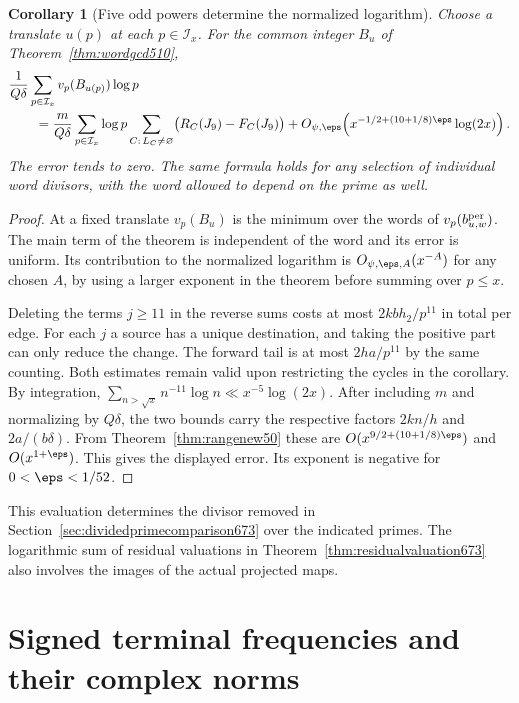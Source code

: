 \documentclass[a4paper,11pt]{article}
\newtheorem{corollary}[proposition]{Corollary}
\theoremstyle{definition}
\theoremstyle{remark}
\numberwithin{equation}{section}
\begin{document}
\begin{corollary}[Five odd powers determine the normalized logarithm]
\leavevmode\label{cor:fivepowers674}
Choose a translate \(u(p)\) at each \(p\in\mathcal I_x\).
For the common integer \(B_u\) of Theorem~\ref{thm:wordgcd510},
\[
 \begin{aligned}
 &\frac{1}{Q\delta}\sum_{p\in\mathcal I_x}v_p(B_{u(p)})\log p\\
 &\qquad =
 \frac m{Q\delta}\sum_{p\in\mathcal I_x}\log p
    \sum_{C:\,L_C\ne\varnothing}\bigl(R_C(J_9)-F_C(J_9)\bigr)
   +O_{\psi,\eps}\!\left(x^{-1/2+(10+1/8)\eps}\log(2x)\right).
 \end{aligned}
\]
The error tends to zero. The same formula holds for any selection
of individual word divisors, with the word allowed to depend on
the prime as well.
\end{corollary}
\begin{proof}
At a fixed translate \(v_p(B_u)\) is the minimum over the
words of \(v_p(b^{\rm per}_{u,w})\). The main term of the theorem
is independent of the word and its error is uniform. Its
contribution to the normalized logarithm is
\(O_{\psi,\eps,A}(x^{-A})\) for any chosen \(A\), by using a
larger exponent in the theorem before summing over \(p\le x\).

Deleting the terms \(j\ge11\) in the reverse sums costs at most
\(2kbh_2/p^{11}\) in total per edge. For each \(j\) a source
has a unique destination, and taking the positive part can
only reduce the change. The forward tail is at most
\(2ha/p^{11}\) by the same counting. Both estimates remain valid
upon restricting the cycles in the corollary. By integration,
\(\sum_{n>\sqrt x} n^{-11}\log n\ll x^{-5}\log(2x)\).
After including \(m\) and normalizing by \(Q\delta\), the two
bounds carry the respective factors \(2kn/h\) and
\(2a/(b\delta)\). From Theorem~\ref{thm:rangenew50} these are
\(O(x^{9/2+(10+1/8)\eps})\) and \(O(x^{1+\eps})\).
This gives the displayed error. Its exponent is negative for
\(0<\eps<1/52\).
\end{proof}

This evaluation determines the divisor removed in
Section~\ref{sec:dividedprimecomparison673} over the indicated
primes. The logarithmic sum of residual valuations in
Theorem~\ref{thm:residualvaluation673} also involves the images
of the actual projected maps.

\section{Signed terminal frequencies and their complex norms}\label{nav:chapter-signed-terminal-frequencies}
\end{document}
